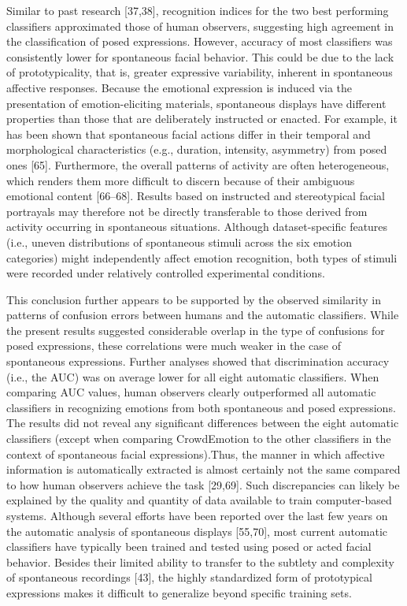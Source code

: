 \documentclass[10pt,letterpaper]{article}
\begin{document}
Similar to past research {[}37,38{]}, recognition indices for the two best performing classifiers approximated those of human observers, suggesting high agreement in the classification of posed expressions. However, accuracy of most classifiers was consistently lower for spontaneous facial behavior. This could be due to the lack of prototypicality, that is, greater expressive variability, inherent in spontaneous affective responses. Because the emotional expression is induced via the presentation of emotion-eliciting materials, spontaneous displays have different properties than those that are deliberately instructed or enacted. For example, it has been shown that spontaneous facial actions differ in their temporal and morphological characteristics (e.g., duration, intensity, asymmetry) from posed ones {[}65{]}. Furthermore, the overall patterns of activity are often heterogeneous, which renders them more difficult to discern because of their ambiguous emotional content {[}66--68{]}. Results based on instructed and stereotypical facial portrayals may therefore not be directly transferable to those derived from activity occurring in spontaneous situations. Although dataset-specific features (i.e., uneven distributions of spontaneous stimuli across the six emotion categories) might independently affect emotion recognition, both types of stimuli were recorded under relatively controlled experimental conditions.

This conclusion further appears to be supported by the observed similarity in patterns of confusion errors between humans and the automatic classifiers. While the present results suggested considerable overlap in the type of confusions for posed expressions, these correlations were much weaker in the case of spontaneous expressions. Further analyses showed that discrimination accuracy (i.e., the AUC) was on average lower for all eight automatic classifiers. When comparing AUC values, human observers clearly outperformed all automatic classifiers in recognizing emotions from both spontaneous and posed expressions. The results did not reveal any significant differences between the eight automatic classifiers (except when comparing CrowdEmotion to the other classifiers in the context of spontaneous facial expressions).Thus, the manner in which affective information is automatically extracted is almost certainly not the same compared to how human observers achieve the task {[}29,69{]}. Such discrepancies can likely be explained by the quality and quantity of data available to train computer-based systems. Although several efforts have been reported over the last few years on the automatic analysis of spontaneous displays {[}55,70{]}, most current automatic classifiers have typically been trained and tested using posed or acted facial behavior. Besides their limited ability to transfer to the subtlety and complexity of spontaneous recordings {[}43{]}, the highly standardized form of prototypical expressions makes it difficult to generalize beyond specific training sets.
\end{document}

